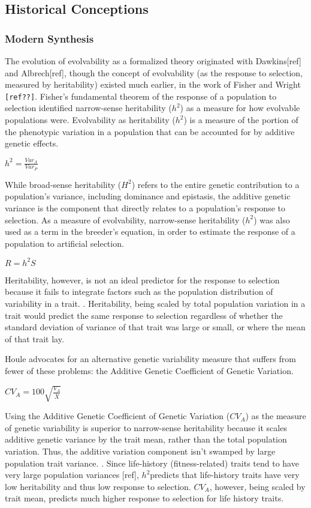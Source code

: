\subsection{Historical Conceptions}
\subsubsection{Modern Synthesis}

The evolution of evolvability as a formalized theory originated with Dawkins[ref] and Albrech[ref], though the concept of evolvability (as the response to selection, measured by heritability) existed much earlier, in the work of Fisher\cite{fisher_genetical_1930}  and Wright \verb|[ref??]|.  Fisher’s fundamental theorem of the response of a population to selection identified narrow-sense heritability ($h^2$) as a measure for how evolvable populations were. Evolvability as heritability ($h^2$) is a measure of the portion of the phenotypic variation in a population that can be accounted for by additive genetic effects.

$h^2 = \frac{Var_A}{Var_P}$

While broad-sense heritability ($H^2$) refers to the entire genetic contribution to a population’s variance, including dominance and epistasis, the additive genetic variance is the component that directly relates to a population’s response to selection.\cite{houle_comparing_1992} As a measure of evolvability, narrow-sense heritability ($h^2$) was also used as a term in the breeder’s equation, in order to estimate the response of a population to artificial selection.

$R = {h^2}S$

Heritability, however, is not an ideal predictor for the response to selection because it fails to integrate factors such as the population distribution of variability in a trait. \cite{houle_comparing_1992}. Heritability, being scaled by total population variation in a trait would predict the same response to selection regardless of whether the standard deviation of variance of that trait was large or small, or where the mean of that trait lay.

Houle advocates for an alternative genetic variability measure that suffers from fewer of these problems: the Additive Genetic Coefficient of Genetic Variation.

$CV_A = 100\sqrt{\frac{V_A}{\bar X}}$

Using the Additive Genetic Coefficient of Genetic Variation ($CV_A$) as the measure of genetic variability is superior to narrow-sense heritability because it scales additive genetic variance by the trait mean, rather than the total population variation. Thus, the additive variation component isn’t swamped by large population trait variance. \cite{hansen_measuring_2008}. Since life-history (fitness-related) traits tend to have very large population variances [ref], $h^2$predicts that life-history traits have very low heritability and thus low response to selection. $CV_A$, however, being scaled by trait mean, predicts much higher response to selection for life history traits. \cite{hansen_heritability_2011} \cite{houle_comparing_1992}

